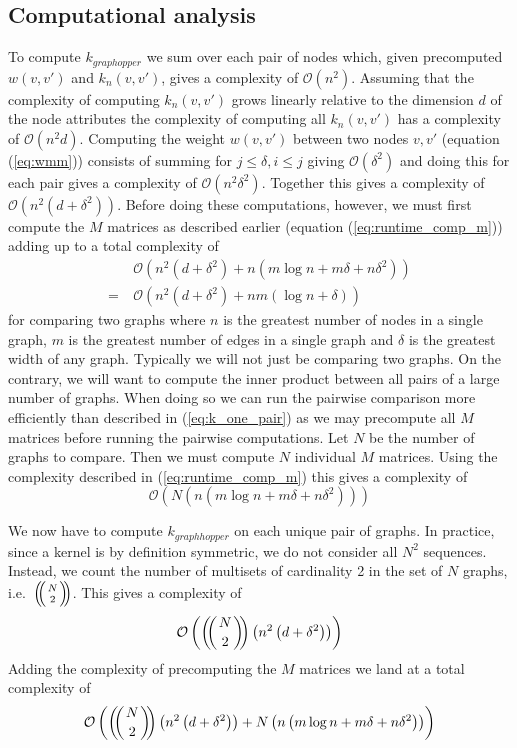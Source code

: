 \documentclass{article}
\def\multiset#1#2{\ensuremath{\left(\kern-.3em\left(\genfrac{}{}{0pt}{}{#1}{#2}\right)\kern-.3em\right)}}
\begin{document}
\subsection{Computational analysis}
To compute $k_{graphopper}$ we sum over each pair of nodes which, given precomputed $w(v,v')$ and $k_n(v,v')$, gives a complexity of $\mathcal{O}(n^2)$. Assuming that the complexity of computing $k_n(v,v')$ grows linearly relative to the dimension $d$ of the node attributes the complexity of computing all $k_n(v,v')$ has a complexity of $\mathcal{O}(n^2d)$. Computing the weight $w(v,v')$ between two nodes $v,v'$ (equation (\ref{eq:wmm})) consists of summing for $j\leq \delta,i\leq j$ giving $\mathcal{O}(\delta^2)$ and doing this for each pair gives a complexity of $\mathcal{O}(n^2\delta^2)$. Together this gives a complexity of $\mathcal{O}(n^2(d + \delta^2))$. Before doing these computations, however, we must first compute the $M$ matrices as described earlier (equation (\ref{eq:runtime_comp_m})) adding up to a total complexity of
\begin{align}
&\mathcal{O}\left(n^2\left(d + \delta^2\right) + n\left(m\log n + m\delta + n\delta^2\right)\right)\\
=\ &\mathcal{O}\left(n^2\left(d+\delta^2\right)+nm\left(\log n + \delta\right)\right)
\label{eq:k_one_pair}
\end{align}
for comparing two graphs where $n$ is the greatest number of nodes in a single graph, $m$ is the greatest number of edges in a single graph and $\delta$ is the greatest width of any graph. Typically we will not just be comparing two graphs. On the contrary, we will want to compute the inner product between all pairs of a large number of graphs. When doing so we can run the pairwise comparison more efficiently than described in (\ref{eq:k_one_pair}) as we may precompute all $M$ matrices before running the pairwise computations. Let $N$ be the number of graphs to compare. Then we must compute $N$ individual $M$ matrices. Using the complexity described in (\ref{eq:runtime_comp_m}) this gives a complexity of
\begin{equation}
\mathcal{O}\left(N\left(n\left(m\log n + m\delta + n\delta^2\right)\right)\right)
\end{equation}

We now have to compute $k_{graphhopper}$ on each unique pair of graphs. In practice, since a kernel is by definition symmetric, we do not consider all $N^2$ sequences. Instead, we count the number of multisets of cardinality 2 in the set of $N$ graphs, i.e.\ $\multiset{N}{2}$. This gives a complexity of
\begin{equation}
\mathcal{O}\left(\multiset{N}{2}\left(n^2\left(d+\delta^2\right)\right)\right)
\end{equation}
Adding the complexity of precomputing the $M$ matrices we land at a total complexity of
\begin{equation}
\mathcal{O}\left(\multiset{N}{2}\left(n^2\left(d+\delta^2\right)\right) + N\left(n\left(m\log n + m\delta + n\delta^2\right)\right)\right)
\end{equation}
\end{document}

